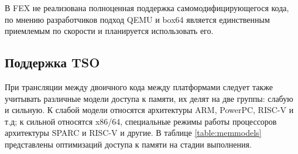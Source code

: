 В FEX не реализована полноценная поддержка самомодифицирующегося кода, по мнению разработчиков подход QEMU и box64 является единственным приемлемым по скорости и планируется использовать его. \cite{FEX_letter}

\subsection{Поддержка TSO}

При трансляции между двоичного кода между платформами следует также учитывать различные модели доступа к памяти, их делят на две группы: слабую и сильную. К слабой модели относятся архитектуры ARM, PowerPC, RISC-V и т.д; к сильной относятся x86/64, специальные режимы работы процессоров архитектуры SPARC и RISC-V и другие. В таблице \ref{table:memmodels} представлены оптимизаций доступа к памяти на стадии выполнения.

\begin{table}[!htb]
	\begin{center}
		\label{table:memmodels}
		\caption{Таблица переупорядочиваний обращений к памяти \cite{memry}}
	\end{center}
\end{table}

\newpage

